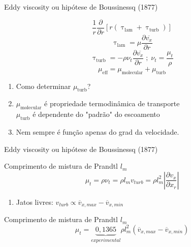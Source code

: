 \documentclass[10pt]{beamer}
\newcommand{\ddx}[2]{\dfrac{\partial #1}{\partial x_{#2}}}
\newcommand{\m}[1]{\overline{#1}}
\begin{document}
\begin{frame}{Eddy viscosity ou hipótese de Boussinessq (1877)}

	\begin{block}{ }
		\begin{equation*}
		\dfrac{1}{r} \dfrac{\partial}{\partial r}\left[ r \left( \uptau_{\text{lam}} + \uptau_{\text{turb}} \right) \right]
		\end{equation*}
		\begin{equation*}
		\uptau_{\text{lam}} = \mu \dfrac{\partial \m{v_x}}{\partial r}
		\end{equation*}
		\begin{equation*}
		\uptau_{\text{turb}} = - \rho \nu_t \dfrac{\partial \m{v_x}}{\partial r} \;;\; \nu_t = \dfrac{\mu_t}{\rho}
		\end{equation*}
		\begin{equation*}
		\mu_{\text{eff}} = \mu_{\text{molecular}} + \mu_{\text{turb}}
		\end{equation*}
	\end{block}
	
	\begin{enumerate}
		\item Como determinar $ \mu_{\text{turb}} $?
		\item $ \mu_{\text{molecular}} $ é propriedade termodinâmica de transporte\\
		$ \mu_{\text{turb}} $ é dependente do "padrão" do escoamento
		\item Nem sempre é função apenas do grad da velocidade.
	\end{enumerate}
\end{frame}

\begin{frame}{Eddy viscosity ou hipótese de Boussinessq (1877)}
	
	\begin{block}{Comprimento de mistura de Prandtl $l_m$}
		\begin{equation*}
		\mu_t = \rho \nu_t = \rho l_m v_{turb} = \rho l_m^2 \left| \ddx{v_x}{r} \right|
		\end{equation*}
	\end{block}

	\begin{enumerate}[$\bullet$]
		\item Jatos livres: $v_{turb} \propto \overline{v}_{x,max} - \overline{v}_{x,min}$
	\end{enumerate}

	\begin{block}{Comprimento de mistura de Prandtl $l_m$}
		\begin{equation*}
		\mu_t = \underbrace{0,1365}_{experimental} \rho l_m^2 \left( \overline{v}_{x,max} - \overline{v}_{x,min} \right)
		\end{equation*}
	\end{block}

\end{frame}
\end{document}
